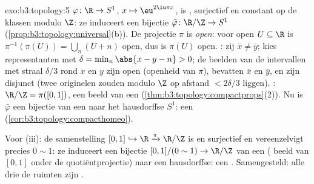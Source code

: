\begin{solution}{exo:b3:topology:5}
$\varphi \colon \R \to S^1$, $x \mapsto \eu^{2\iu\pi x}$, is
, surjectief en constant op de klassen modulo $\Z$: ze
induceert een  bijectie $\bar\varphi \colon \R/\Z \to S^1$
(\cref{prop:b3:topology:universal}(b)). De projectie $\pi$ is
\emph{open}: voor open $U \subseteq \R$ is $\pi^{-1}(\pi(U)) =
\bigcup_{n}(U + n)$ open, dus is $\pi(U)$ open. : zij
$\bar x \neq \bar y$; kies representanten met $\delta =
\min_{n}\abs{x - y - n} > 0$; de beelden van de intervallen met
straal $\delta/3$ rond $x$ en $y$ zijn open (openheid van $\pi$),
bevatten $\bar x$ en $\bar y$, en zijn disjunct (twee originelen
zouden modulo $\Z$ op afstand $< 2\delta/3$ liggen). :
$\R/\Z = \pi([0,1])$, een  beeld van een 
(\cref{thm:b3:topology:compactprops}(2)). Nu is $\bar\varphi$ een
 bijectie van een  naar het hausdorffse
$S^1$: een 
(\cref{cor:b3:topology:compacthomeo}).

Voor (iii): de samenstelling $[0,1] \hookrightarrow \R
\xrightarrow{\pi} \R/\Z$ is  en surjectief en
vereenzelvigt precies $0 \sim 1$: ze induceert een 
bijectie $[0,1]/(0\sim1) \to \R/\Z$ van een 
( beeld van $[0,1]$ onder de quotiëntprojectie) naar een
hausdorffse: een . Samengesteld: alle drie de ruimten
zijn .
\end{solution}

